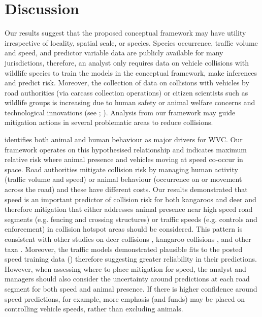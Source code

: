 \section{Discussion}

Our results suggest that the proposed conceptual framework may have utility irrespective of locality, spatial scale, or species.  Species occurrence, traffic volume and speed, and  predictor variable data are publicly available for many jurisdictions, therefore, an analyst only requires data on vehicle collisions with wildlife species to train the models in the conceptual framework, make inferences and predict risk.  Moreover, the collection of data on collisions with vehicles by road authorities (via carcass collection operations) or citizen scientists such as wildlife groups is increasing due to human safety or animal welfare concerns and technological innovations (see \cite{olso14}; \cite{shil15b}).  Analysis from our framework may guide mitigation actions in several problematic areas to reduce collisions.

\cite{form03} identifies both animal and human behaviour as major drivers for WVC.  Our framework operates on this hypothesised relationship and indicates maximum relative risk where animal presence and vehicles moving at speed co-occur in space.  Road authorities mitigate collision risk by managing human activity (traffic volume and speed) or animal behaviour (occurrence on or movement across the road) and these have different costs.  Our results demonstrated that speed is an important predictor of collision risk for both kangaroos and deer and therefore mitigation that either addresses animal presence near high speed road segments (e.g. fencing and crossing structures) or traffic speeds (e.g. controls and enforcement) in collision hotspot areas should be considered.  This pattern is consistent with other studies on deer collisions \citep{gkri13,meis14,sudh09}, kangaroo collisions \citep{rowd08}, and other taxa \citep{guns11}.  Moreover, the traffic models demonstrated plausible fits to the posted speed training data () therefore suggesting greater reliability in their predictions.  However, when assessing where to place mitigation for speed, the analyst and managers should also consider the uncertainty around predictions at each road segment for both speed and animal presence. If there is higher confidence around speed predictions, for example, more emphasis (and funds) may be placed on controlling vehicle speeds, rather than excluding animals.

